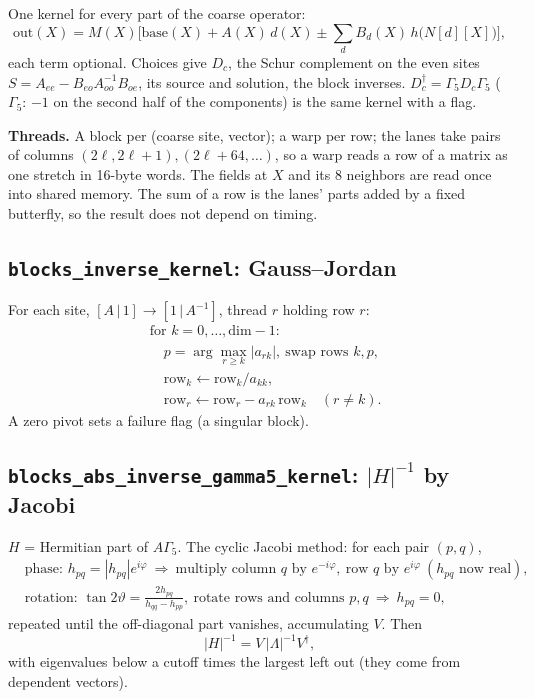 \documentclass[11pt,a4paper]{article}
\numberwithin{equation}{section}
\newcommand{\code}[1]{\texttt{\small #1}}
\newcommand{\dg}{^{\dagger}}
\begin{document}
One kernel for every part of the coarse operator:
\begin{equation}
\text{out}(X) = M(X)\Big[\text{base}(X) + A(X)\,d(X) \pm \sum_{d}B_d(X)\,h\big(N[d][X]\big)\Big],
\end{equation}
each term optional. Choices give $D_c$, the Schur complement on the even sites
$S = A_{ee}-B_{eo}A_{oo}^{-1}B_{oe}$, its source and solution, the block inverses.
$D_c\dg=\Gamma_5D_c\Gamma_5$ ($\Gamma_5$: $-1$ on the second half of the components) is the same
kernel with a flag.

\textbf{Threads.} A block per (coarse site, vector); a warp per row; the lanes take pairs of
columns $(2\ell,2\ell+1),(2\ell+64,\dots)$, so a warp reads a row of a matrix as one stretch in
16-byte words. The fields at $X$ and its 8 neighbors are read once into shared memory. The sum of
a row is the lanes' parts added by a fixed butterfly, so the result does not depend on timing.

\subsection{\code{blocks\_inverse\_kernel}: Gauss–Jordan}

For each site, $[A\,|\,1]\to[1\,|\,A^{-1}]$, thread $r$ holding row $r$:
\begin{align}
&\text{for }k=0,\dots,\text{dim}-1:\\
&\quad p = \arg\max_{r\ge k}|a_{rk}|,\ \text{swap rows }k,p,\\
&\quad \text{row}_k \leftarrow \text{row}_k/a_{kk},\\
&\quad \text{row}_r \leftarrow \text{row}_r - a_{rk}\,\text{row}_k\quad(r\ne k).
\end{align}
A zero pivot sets a failure flag (a singular block).

\subsection{\code{blocks\_abs\_inverse\_gamma5\_kernel}: $|H|^{-1}$ by Jacobi}

$H$ = Hermitian part of $A\Gamma_5$. The cyclic Jacobi method: for each pair $(p,q)$,
\begin{align}
&\text{phase: } h_{pq} = |h_{pq}|e^{i\varphi}\ \Rightarrow\ \text{multiply column }q\text{ by }e^{-i\varphi},\ \text{row }q\text{ by }e^{i\varphi}\ (h_{pq}\text{ now real}),\\
&\text{rotation: } \tan2\vartheta = \frac{2h_{pq}}{h_{qq}-h_{pp}},\ \text{rotate rows and columns }p,q\ \Rightarrow\ h_{pq}=0,
\end{align}
repeated until the off-diagonal part vanishes, accumulating $V$. Then
\begin{equation}
|H|^{-1} = V\,|\Lambda|^{-1}V\dg,
\end{equation}
with eigenvalues below a cutoff times the largest left out (they come from dependent vectors).
\end{document}
